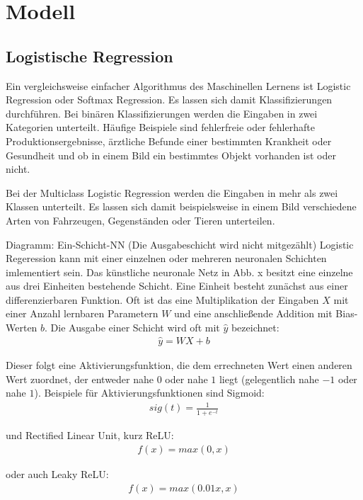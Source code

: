 \chapter{Modell}
\label{ch:model}


\section{Logistische Regression}
\label{sec:logreg}
Ein vergleichsweise einfacher Algorithmus des Maschinellen Lernens ist Logistic Regression oder Softmax Regression. Es lassen sich damit Klassifizierungen durchführen. Bei binären Klassifizierungen werden die Eingaben in zwei Kategorien unterteilt. Häufige Beispiele sind fehlerfreie oder fehlerhafte Produktionsergebnisse, ärztliche Befunde einer bestimmten Krankheit oder Gesundheit und ob in einem Bild ein bestimmtes Objekt vorhanden ist oder nicht.

Bei der Multiclass Logistic Regression werden die Eingaben in mehr als zwei Klassen unterteilt. Es lassen sich damit beispielsweise in einem Bild  verschiedene Arten von Fahrzeugen, Gegenständen oder Tieren unterteilen.

Diagramm: Ein-Schicht-NN (Die Ausgabeschicht wird nicht mitgezählt) Logistic Regeression kann mit einer einzelnen oder mehreren neuronalen Schichten imlementiert sein. Das künstliche neuronale Netz in Abb. x besitzt eine einzelne aus drei Einheiten bestehende Schicht. Eine Einheit besteht zunächst aus einer differenzierbaren Funktion. Oft ist das eine Multiplikation der Eingaben $X$ mit einer Anzahl lernbaren Parametern $W$ und eine anschließende Addition mit Bias-Werten $b$. Die Ausgabe einer Schicht wird oft mit $\hat{y}$ bezeichnet:
\begin{align}
\hat{y} = WX+b
\end{align}

Dieser folgt eine Aktivierungsfunktion, die dem errechneten Wert einen anderen Wert zuordnet, der entweder nahe $0$ oder nahe $1$ liegt (gelegentlich nahe $-1$ oder nahe $1$). Beispiele für Aktivierungsfunktionen sind Sigmoid:
\begin{align}
sig(t) = \frac{1}{1+e^{-t}}
\end{align}

und Rectified Linear Unit, kurz ReLU:
\begin{align}
f(x) = max(0, x)
\end{align}

oder auch Leaky ReLU:
\begin{align}
f(x) = max(0.01x, x)
\end{align}

